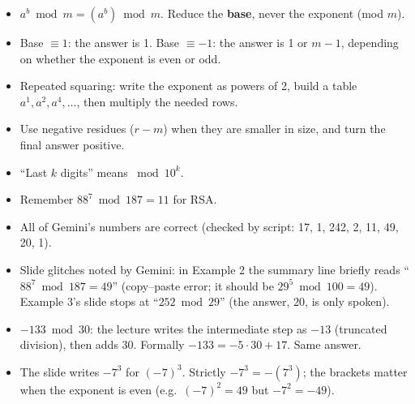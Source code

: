 \begin{examtip}
\begin{itemize}
  \item $a^b \bmod m = (a^b) \bmod m$. Reduce the \textbf{base}, never the exponent (mod $m$).
  \item Base $\equiv 1$: the answer is 1. Base $\equiv -1$: the answer is 1 or $m - 1$, depending on whether the exponent is even or odd.
  \item Repeated squaring: write the exponent as powers of 2, build a table $a^1, a^2, a^4, \dots$, then multiply the needed rows.
  \item Use negative residues ($r - m$) when they are smaller in size, and turn the final answer positive.
  \item ``Last $k$ digits'' means $\bmod 10^k$.
  \item Remember $88^7 \bmod 187 = 11$ for RSA.
\end{itemize}
\end{examtip}

\begin{fixbox}
\begin{itemize}
  \item All of Gemini's numbers are correct (checked by script: 17, 1, 242, 2, 11, 49, 20, 1).
  \item Slide glitches noted by Gemini: in Example 2 the summary line briefly reads ``$88^7 \bmod 187 = 49$'' (copy--paste error; it should be $29^5 \bmod 100 = 49$). Example 3's slide stops at ``$252 \bmod 29$'' (the answer, 20, is only spoken).
  \item $-133 \bmod 30$: the lecture writes the intermediate step as $-13$ (truncated division), then adds 30. Formally $-133 = -5\cdot30 + 17$. Same answer.
  \item The slide writes $-7^3$ for $(-7)^3$. Strictly $-7^3 = -(7^3)$; the brackets matter when the exponent is even (e.g.\ $(-7)^2 = 49$ but $-7^2 = -49$).
\end{itemize}
\end{fixbox}

